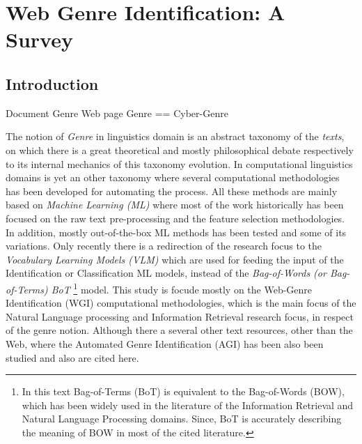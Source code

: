 
\chapter{Web Genre Identification: A Survey}

\label{chap:relevant_work}


\newcommand{\keyword}[1]{\textbf{#1}}
\newcommand{\tabhead}[1]{\textbf{#1}}
\newcommand{\code}[1]{\texttt{#1}}
\newcommand{\file}[1]{\texttt{\bfseries#1}}
\newcommand{\option}[1]{\texttt{\itshape#1}}


\section{Introduction}\label{chap:relevant_work:sec:intro}


Document Genre
Web page Genre == Cyber-Genre

The notion of \textit{Genre} in linguistics domain is an abstract taxonomy of the \textit{texts}, on which there is a great theoretical and mostly philosophical debate respectively to its internal mechanics of this taxonomy evolution. In computational linguistics domains is yet an other taxonomy where several computational methodologies has been developed for automating the process. All these methods are mainly based on \textit{Machine Learning (ML)} where most of the work historically has been focused on the raw text pre-processing and the feature selection methodologies. In addition, mostly out-of-the-box ML methods has been tested and some of its variations. Only recently there is a redirection of the research focus to the \textit{Vocabulary Learning Models (VLM)} which are used for feeding the input of the Identification or Classification ML models, instead of the \textit{Bag-of-Words (or Bag-of-Terms) BoT }\footnote{In this text Bag-of-Terms (BoT) is equivalent to the Bag-of-Words  (BOW), which has been widely used in the literature of the Information Retrieval and Natural Language Processing domains. Since, BoT is accurately describing the meaning of BOW in most of the cited literature.} model. This study is focude mostly on the Web-Genre Identification (WGI) computational methodologies, which is the main focus of the Natural Language processing and Information Retrieval research focus, in respect of the genre notion. Although there a several other text resources, other than the Web, where the Automated Genre Identification (AGI) has been also been studied and also are cited here.

